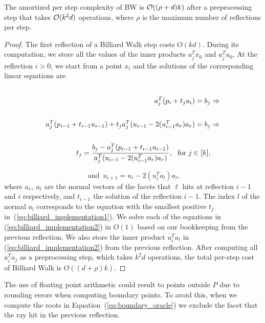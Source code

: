    \begin{lem}
   \label{lem:BW-step-cost}
   The amortized per step complexity of BW is $\mathcal{O}((\rho + d)k)$ after a preprocessing step that takes $\mathcal{O}(k^2d)$ operations, where $\rho$ is the maximum number of reflections per step.
   \end{lem}

   \begin{proof}
      The first reflection of a Billiard Walk step costs $O(kd)$.
      During its computation, we store all the values of the inner
      products $a_j^Tx_0$ and $a_j^Tu_0$.
      At the reflection $i>0$, we start from a point $x_i$
      and the solutions of the corresponding linear equations are
      \label{eq:billiard_implementation1}
      \begin{equation*}
      \begin{split}
         \cr a_j^T(p_i + t_ju_i) = b_j & \Rightarrow \\
         \cr a_j^T(p_{i-1} + t_{i-1}u_{i-1})
         + t_ja_j^T(u_{i-1}-2(u_{i-1}^Ta_r) a_r) = b_j  & \Rightarrow \\
         \cr t_j = \frac{b_j - a_j^T(p_{i-1} +  t_{i-1}u_{i-1})}{a_j^T(u_{i-1}-2(u_{i-1}^Ta_r) a_r)},\
         \text{ for }  j \in [k]  ,
         \end{split}
      \end{equation*}

      \begin{equation}\label{eq:billiard_implementation2}
      \text{ and } \, u_{i+1} = u_i -2(u_i^Ta_l) a_l,
      \end{equation}
      where $a_r,\ a_l$ are the normal vectors of the facets that $\ell$ hits at reflection $i-1$ and $i$ respectively, and $t_{i-1}$ the solution of the  reflection $i-1$.
      The index $l$ of the normal $a_l$
      corresponds to the equation with the smallest positive $t_j$
      in~(\ref{eq:billiard_implementation1}).
      We solve each of the  equations in (\ref{eq:billiard_implementation2}) in $O(1)$ based on our bookkeeping from the  previous reflection.
      We also store the inner product $u_i^Ta_l$ in (\ref{eq:billiard_implementation2}) from the  previous reflection.
      After computing all $a_i^Ta_j$ as a preprocessing step, which takes $k^2d$ operations, the total per-step cost of Billiard Walk is $O((d+\rho)k)$.
   \end{proof}




   The use of floating point arithmetic could result to points outside $P$ due to rounding errors when computing boundary points. To avoid this, when we compute the roots in Equation~(\ref{eq:boundary_oracle}) we exclude the facet that the ray hit in the previous reflection.


